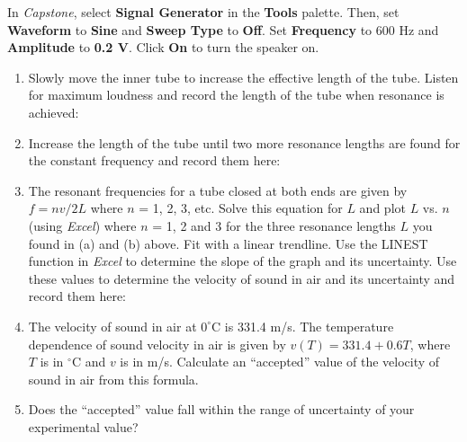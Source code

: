 \item In \textit{Capstone}, select \textbf{Signal Generator} in the \textbf{Tools} palette. Then, set \textbf{Waveform} to \textbf{Sine} and \textbf{Sweep Type} to \textbf{Off}. Set \textbf{Frequency} to 600 Hz and \textbf{Amplitude} to \textbf{0.2 V}. Click \textbf{On} to turn the speaker on.

\begin{enumerate}[labparts]
\item Slowly move the inner tube to increase the effective length of the tube. Listen for maximum loudness and record the length of the tube when resonance is achieved:
\vspace{10mm}

\item Increase the length of the tube until two more resonance lengths are found for the constant frequency and record them here:
\vspace{10mm}


\item The resonant frequencies for a tube closed at both ends are given by 
$f=nv/2L$ where $n$ = 1, 2, 3, etc. Solve this equation for $L$ and plot $L$ 
vs. $n$ (using \textit{Excel}) where $n$ = 1, 2 and 3 for the three resonance lengths $L$
you found in (a) and (b) above. Fit with a linear trendline. Use the LINEST function in \textit{Excel} to determine the slope of the graph and its uncertainty. Use these values to determine the velocity of sound in air and its uncertainty and record them here:
\vspace{20mm}

\item The velocity of sound in air at $0^\circ$C is 331.4 m/s.  The temperature dependence of sound velocity in air is given by $v(T) = 331.4 + 0.6T$, where $T$ is in $^\circ$C and $v$ is in m/s. Calculate an ``accepted'' value of the velocity of sound in air from this formula.
\vspace{20mm}

\item Does the ``accepted'' value fall within the range of uncertainty of your experimental value?
\answerspace{5mm}
\end{enumerate}
